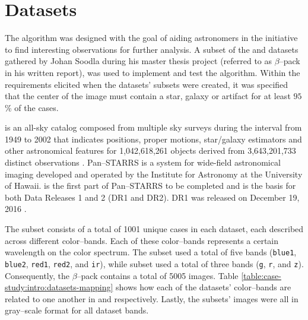 \section{Datasets} \label{sect:meth:datasets}

The \mlblink algorithm was designed with the goal of aiding astronomers in the \vasco initiative to find interesting observations for further analysis. A subset of the \usno and \panstarrs datasets gathered by Johan Soodla during his master thesis project (referred to as $\beta$--pack in his written report), was used to implement and test the algorithm. Within the requirements elicited when the datasets' subsets were created, it was specified that the center of the image must contain a star, galaxy or artifact for at least $95$\% of the cases. \newline

\usno is an all-sky catalog composed from multiple sky surveys during the interval from 1949 to 2002 \cite{web:caltech:usno} that indicates positions, proper motions, star/galaxy estimators and other astronomical features for 1,042,618,261 objects derived from 3,643,201,733 distinct observations \cite{web:ap-i:usno}. Pan--STARRS is a system for wide-field astronomical imaging developed and operated by the Institute for Astronomy at the University of Hawaii. \panstarrs is the first part of Pan--STARRS to be completed and is the basis for both Data Releases 1 and 2 (DR1 and DR2). \panstarrs DR1 was released on December 19, 2016 \cite{web:stsci:panstarrs}.  \newline

The subset consists of a total of 1001 unique cases in each dataset, each described across different color--bands. Each of these color--bands represents a certain wavelength on the color spectrum. The \usno subset used a total of five bands (\texttt{blue1}, \texttt{blue2}, \texttt{red1}, \texttt{red2}, and \texttt{ir}), while \panstarrs subset used a total of three bands (\texttt{g}, \texttt{r}, and \texttt{z}). Consequently, the $\beta$--pack contains a total of 5005 images. Table \ref{table:case-study:intro:datasets-mapping} shows how each of the datasets' color--bands are related to one another in \usno and \panstarrs respectively. Lastly, the subsets' images were all in gray--scale format for all dataset bands. 

